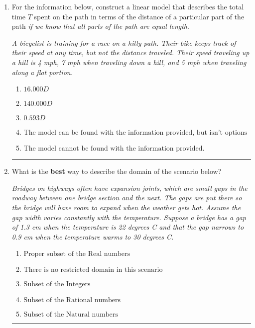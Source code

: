 \documentclass[14pt]{extbook}
\newcommand{\litem}[1]{\item#1\hspace*{-1cm}\rule{\textwidth}{0.4pt}}
\begin{document}
\begin{enumerate}
{\begin{enumerate}[label=\Alph*.]
\end{enumerate} }
\litem{
For the information below, construct a linear model that describes the total time $T$ spent on the path in terms of the distance of a particular part of the path \textit{if we know that all parts of the path are equal length}.
\begin{center}
    \textit{ A bicyclist is training for a race on a hilly path. Their bike keeps track of their speed at any time, but not the distance traveled. Their speed traveling up a hill is 4 mph, 7 mph when traveling down a hill, and 5 mph when traveling along a flat portion. }
\end{center}
\begin{enumerate}[label=\Alph*.]
\item \( 16.000 D \)
\item \( 140.000 D \)
\item \( 0.593 D \)
\item \( \text{The model can be found with the information provided, but isn't options 1-3.} \)
\item \( \text{The model cannot be found with the information provided.} \)

\end{enumerate} }
\litem{
What is the \textbf{best} way to describe the domain of the scenario below?
\begin{center}
    \textit{ Bridges on highways often have expansion joints, which are small gaps in the roadway between one bridge section and the next. The gaps are put there so the bridge will have room to expand when the weather gets hot. Assume the gap width varies constantly with the temperature. Suppose a bridge has a gap of 1.3 cm when the temperature is 22 degrees C and that the gap narrows to 0.9 cm when the temperature warms to 30 degrees C. }
\end{center}
\begin{enumerate}[label=\Alph*.]
\item \( \text{Proper subset of the Real numbers} \)
\item \( \text{There is no restricted domain in this scenario} \)
\item \( \text{Subset of the Integers} \)
\item \( \text{Subset of the Rational numbers} \)
\item \( \text{Subset of the Natural numbers} \)


\end{enumerate}}
\end{enumerate}
\end{document}
